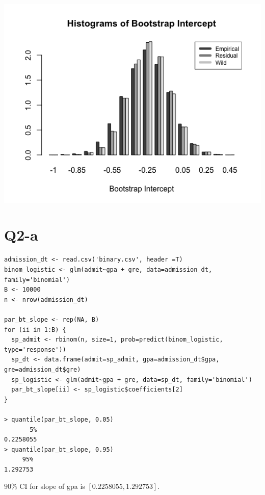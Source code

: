 \documentclass[12pt,letterpaper]{article}
\begin{document}
\includegraphics[width=150mm]{q1-c-2.png}

\newpage
\section*{Q2-a}
\begin{verbatim}
admission_dt <- read.csv('binary.csv', header =T)
binom_logistic <- glm(admit~gpa + gre, data=admission_dt, family='binomial')
B <- 10000
n <- nrow(admission_dt)

par_bt_slope <- rep(NA, B)
for (ii in 1:B) {
  sp_admit <- rbinom(n, size=1, prob=predict(binom_logistic, type='response'))
  sp_dt <- data.frame(admit=sp_admit, gpa=admission_dt$gpa, gre=admission_dt$gre)
  sp_logistic <- glm(admit~gpa + gre, data=sp_dt, family='binomial')
  par_bt_slope[ii] <- sp_logistic$coefficients[2]
}

> quantile(par_bt_slope, 0.05)
       5% 
0.2258055 
> quantile(par_bt_slope, 0.95)
     95% 
1.292753 
\end{verbatim}

\noindent $90 \%$ CI for slope of gpa is $[0.2258055, 1.292753 ]$.
\end{document}
